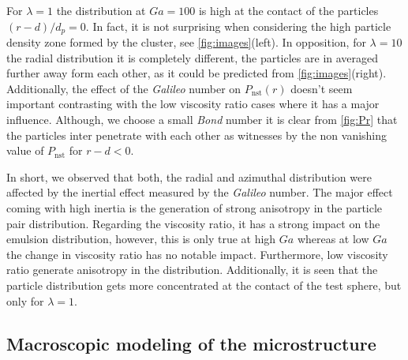 For $\lambda = 1$ the distribution at $Ga = 100$ is high at the contact of the particles $(r-d)/d_p = 0$. 
In fact, it is not surprising when considering the high particle density zone formed by the cluster, see \ref{fig:images}(left). 
In opposition, for $\lambda  = 10$ the radial distribution it is completely different, the particles are in averaged further away form each other, as it could be predicted from \ref{fig:images}(right).
Additionally, the effect of the \textit{Galileo} number on $P_\text{nst}(r)$ doesn't seem important contrasting with the low viscosity ratio cases where it has a major influence.  
Although, we choose a small \textit{Bond} number it is clear from \ref{fig:Pr} that the particles inter penetrate with each other as witnesses by the non vanishing value of $P_\text{nst}$ for $r-d<0$.

In short, we observed that both, the radial and azimuthal distribution were affected by the inertial effect measured by the \textit{Galileo} number. 
The major effect coming with high inertia is the generation of strong anisotropy in the particle pair distribution. 
Regarding the viscosity ratio, it has a strong impact on the emulsion distribution, however, this is only true at high $Ga$ whereas at low $Ga$ the change in viscosity ratio has no notable impact. 
Furthermore, low viscosity ratio generate anisotropy in the distribution.  
Additionally, it is seen that the particle distribution gets more concentrated at the contact of the test sphere, but only for $\lambda = 1$. 


\subsection{Macroscopic modeling of the microstructure}

